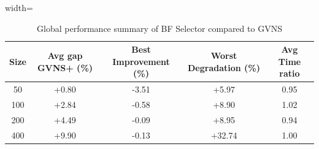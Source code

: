 \begin{table}[ht]
\centering
\footnotesize
\setlength{\tabcolsep}{4pt}
\caption{Global performance summary of BF Selector compared to GVNS}
\vspace{3mm}
\begin{adjustbox}{width=\textwidth}
\begin{tabular}{c c c c c}
\toprule
\textbf{Size} & \textbf{Avg gap GVNS+ (\%)} & \textbf{Best Improvement (\%)} & \textbf{Worst Degradation (\%)} & \textbf{Avg Time ratio} \\
\midrule
50  & +0.80 & -3.51 & +5.97  & 0.95 \\
100 & +2.84 & -0.58 & +8.90  & 1.02 \\
200 & +4.49 & -0.09 & +8.95  & 0.94 \\
400 & +9.90 & -0.13 & +32.74 & 1.00 \\
\bottomrule
\end{tabular}
\end{adjustbox}
\label{tab:bf_summary}
\end{table}